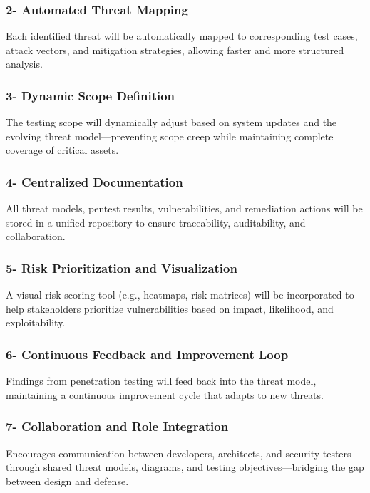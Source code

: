 \documentclass[12pt,a4paper]{report}
\begin{document}
\subsubsection{2- Automated Threat Mapping}

Each identified threat will be automatically mapped to corresponding test cases, attack vectors, and mitigation strategies, allowing faster and more structured analysis.

\subsubsection{3- Dynamic Scope Definition}

The testing scope will dynamically adjust based on system updates and the evolving threat model—preventing scope creep while maintaining complete coverage of critical assets.

\subsubsection{4- Centralized Documentation}

All threat models, pentest results, vulnerabilities, and remediation actions will be stored in a unified repository to ensure traceability, auditability, and collaboration.

\subsubsection{5- Risk Prioritization and Visualization}

A visual risk scoring tool (e.g., heatmaps, risk matrices) will be incorporated to help stakeholders prioritize vulnerabilities based on impact, likelihood, and exploitability.

\subsubsection{6- Continuous Feedback and Improvement Loop}

Findings from penetration testing will feed back into the threat model, maintaining a continuous improvement cycle that adapts to new threats.

\subsubsection{7- Collaboration and Role Integration}

Encourages communication between developers, architects, and security testers through shared threat models, diagrams, and testing objectives—bridging the gap between design and defense.
\end{document}
